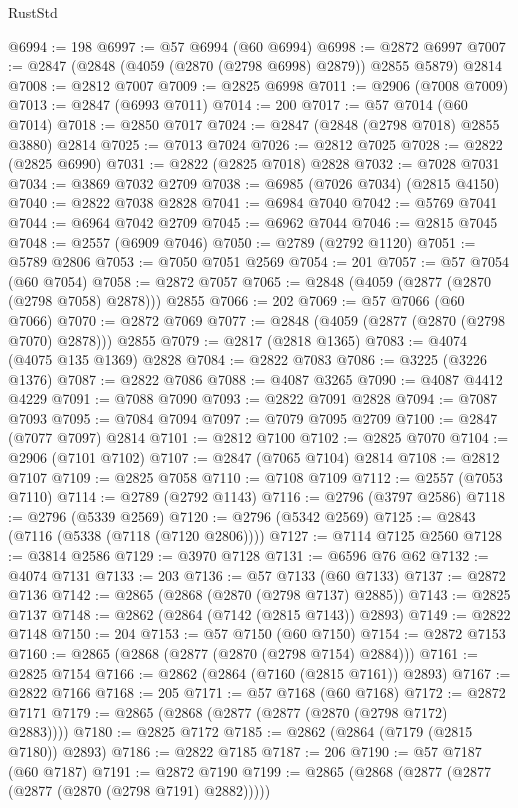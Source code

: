 \begin{lexlean}{RustStd}
\begin{coremodule}
@6994 := 198
@6997 := @57 @6994 (@60 @6994)
@6998 := @2872 @6997
@7007 := @2847 (@2848 (@4059 (@2870 (@2798 @6998) @2879)) @2855 @5879) @2814
@7008 := @2812 @7007
@7009 := @2825 @6998
@7011 := @2906 (@7008 @7009)
@7013 := @2847 (@6993 @7011)
@7014 := 200
@7017 := @57 @7014 (@60 @7014)
@7018 := @2850 @7017
@7024 := @2847 (@2848 (@2798 @7018) @2855 @3880) @2814
@7025 := @7013 @7024
@7026 := @2812 @7025
@7028 := @2822 (@2825 @6990)
@7031 := @2822 (@2825 @7018) @2828
@7032 := @7028 @7031
@7034 := @3869 @7032 @2709
@7038 := @6985 (@7026 @7034) (@2815 @4150)
@7040 := @2822 @7038 @2828
@7041 := @6984 @7040
@7042 := @5769 @7041
@7044 := @6964 @7042 @2709
@7045 := @6962 @7044
@7046 := @2815 @7045
@7048 := @2557 (@6909 @7046)
@7050 := @2789 (@2792 @1120)
@7051 := @5789 @2806
@7053 := @7050 @7051 @2569
@7054 := 201
@7057 := @57 @7054 (@60 @7054)
@7058 := @2872 @7057
@7065 := @2848 (@4059 (@2877 (@2870 (@2798 @7058) @2878))) @2855
@7066 := 202
@7069 := @57 @7066 (@60 @7066)
@7070 := @2872 @7069
@7077 := @2848 (@4059 (@2877 (@2870 (@2798 @7070) @2878))) @2855
@7079 := @2817 (@2818 @1365)
@7083 := @4074 (@4075 @135 @1369) @2828
@7084 := @2822 @7083
@7086 := @3225 (@3226 @1376)
@7087 := @2822 @7086
@7088 := @4087 @3265
@7090 := @4087 @4412 @4229
@7091 := @7088 @7090
@7093 := @2822 @7091 @2828
@7094 := @7087 @7093
@7095 := @7084 @7094
@7097 := @7079 @7095 @2709
@7100 := @2847 (@7077 @7097) @2814
@7101 := @2812 @7100
@7102 := @2825 @7070
@7104 := @2906 (@7101 @7102)
@7107 := @2847 (@7065 @7104) @2814
@7108 := @2812 @7107
@7109 := @2825 @7058
@7110 := @7108 @7109
@7112 := @2557 (@7053 @7110)
@7114 := @2789 (@2792 @1143)
@7116 := @2796 (@3797 @2586)
@7118 := @2796 (@5339 @2569)
@7120 := @2796 (@5342 @2569)
@7125 := @2843 (@7116 (@5338 (@7118 (@7120 @2806))))
@7127 := @7114 @7125 @2560
@7128 := @3814 @2586
@7129 := @3970 @7128
@7131 := @6596 @76 @62
@7132 := @4074 @7131
@7133 := 203
@7136 := @57 @7133 (@60 @7133)
@7137 := @2872 @7136
@7142 := @2865 (@2868 (@2870 (@2798 @7137) @2885))
@7143 := @2825 @7137
@7148 := @2862 (@2864 (@7142 (@2815 @7143)) @2893)
@7149 := @2822 @7148
@7150 := 204
@7153 := @57 @7150 (@60 @7150)
@7154 := @2872 @7153
@7160 := @2865 (@2868 (@2877 (@2870 (@2798 @7154) @2884)))
@7161 := @2825 @7154
@7166 := @2862 (@2864 (@7160 (@2815 @7161)) @2893)
@7167 := @2822 @7166
@7168 := 205
@7171 := @57 @7168 (@60 @7168)
@7172 := @2872 @7171
@7179 := @2865 (@2868 (@2877 (@2877 (@2870 (@2798 @7172) @2883))))
@7180 := @2825 @7172
@7185 := @2862 (@2864 (@7179 (@2815 @7180)) @2893)
@7186 := @2822 @7185
@7187 := 206
@7190 := @57 @7187 (@60 @7187)
@7191 := @2872 @7190
@7199 := @2865 (@2868 (@2877 (@2877 (@2877 (@2870 (@2798 @7191) @2882)))))

\end{coremodule}
\end{lexlean}
